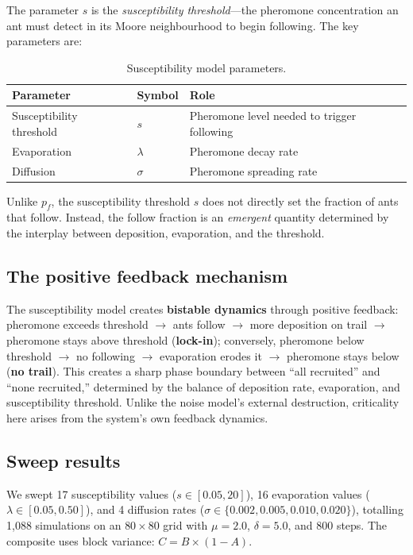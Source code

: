 \documentclass[11pt,a4paper]{article}
\begin{document}
The parameter $s$ is the \emph{susceptibility threshold}---the pheromone concentration an ant must detect in its Moore neighbourhood to begin following.
The key parameters are:

\begin{table}[H]
\centering
\caption{Susceptibility model parameters.}
\label{tab:suscept}
\begin{tabular}{@{}lll@{}}
\toprule
Parameter & Symbol & Role \\
\midrule
Susceptibility threshold & $s$ & Pheromone level needed to trigger following \\
Evaporation & $\lambda$ & Pheromone decay rate \\
Diffusion & $\sigma$ & Pheromone spreading rate \\
\bottomrule
\end{tabular}
\end{table}

Unlike $p_f$, the susceptibility threshold $s$ does not directly set the fraction of ants that follow.
Instead, the follow fraction is an \emph{emergent} quantity determined by the interplay between deposition, evaporation, and the threshold.

\subsection{The positive feedback mechanism}

The susceptibility model creates \textbf{bistable dynamics} through positive feedback: pheromone exceeds threshold $\to$ ants follow $\to$ more deposition on trail $\to$ pheromone stays above threshold (\textbf{lock-in}); conversely, pheromone below threshold $\to$ no following $\to$ evaporation erodes it $\to$ pheromone stays below (\textbf{no trail}).
This creates a sharp phase boundary between ``all recruited'' and ``none recruited,'' determined by the balance of deposition rate, evaporation, and susceptibility threshold.
Unlike the noise model's external destruction, criticality here arises from the system's own feedback dynamics.

\subsection{Sweep results}

We swept 17 susceptibility values ($s \in [0.05, 20]$), 16 evaporation values ($\lambda \in [0.05, 0.50]$), and 4 diffusion rates ($\sigma \in \{0.002, 0.005, 0.010, 0.020\}$), totalling 1{,}088 simulations on an $80 \times 80$ grid with $\mu = 2.0$, $\delta = 5.0$, and 800 steps.
The composite uses block variance: $C = B \times (1 - A)$.
\end{document}
